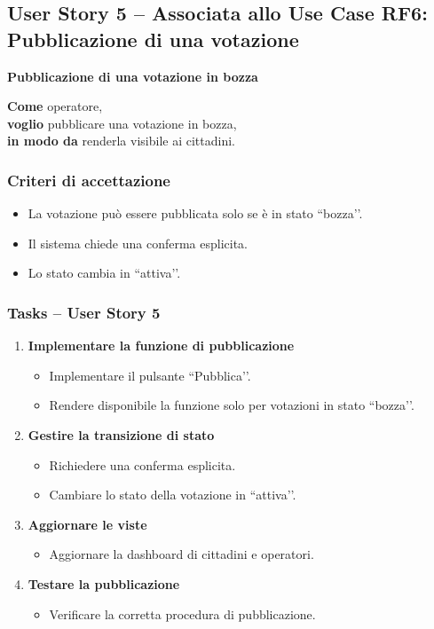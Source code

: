\documentclass{article}
\begin{document}

\subsection{User Story 5 -- Associata allo Use Case RF6: Pubblicazione di una votazione}

\textbf{Pubblicazione di una votazione in bozza}

\textbf{Come} operatore,\\
\textbf{voglio} pubblicare una votazione in bozza,\\
\textbf{in modo da} renderla visibile ai cittadini.

\subsubsection{Criteri di accettazione}
\begin{itemize}
    \item La votazione può essere pubblicata solo se è in stato ``bozza’’.
    \item Il sistema chiede una conferma esplicita.
    \item Lo stato cambia in ``attiva’’.
\end{itemize}

\subsubsection{Tasks -- User Story 5}
\begin{enumerate}
    \item \textbf{Implementare la funzione di pubblicazione}
    \begin{itemize}
        \item Implementare il pulsante ``Pubblica’’.
        \item Rendere disponibile la funzione solo per votazioni in stato ``bozza’’.
    \end{itemize}

    \item \textbf{Gestire la transizione di stato}
    \begin{itemize}
        \item Richiedere una conferma esplicita.
        \item Cambiare lo stato della votazione in ``attiva’’.
    \end{itemize}

    \item \textbf{Aggiornare le viste}
    \begin{itemize}
        \item Aggiornare la dashboard di cittadini e operatori.
    \end{itemize}

    \item \textbf{Testare la pubblicazione}
    \begin{itemize}
        \item Verificare la corretta procedura di pubblicazione.
    \end{itemize}
\end{enumerate}
\end{document}
